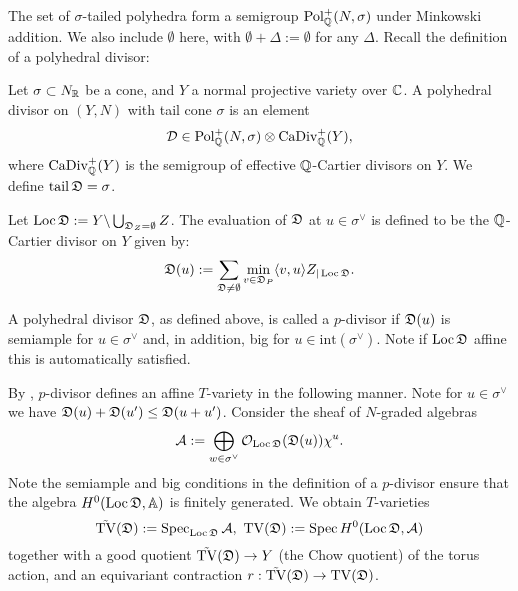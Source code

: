 The set of \(\sigma\)-tailed polyhedra form a semigroup \(\operatorname{Pol}_{\mathbb{Q}}^+(N,\sigma)\) under Minkowski addition. We also include \(\emptyset\) here, with \(\emptyset + \Delta := \emptyset\) for any \(\Delta\). Recall the definition of a polyhedral divisor:
\begin{definition}
Let \(\sigma \subset N_{\mathbb{R}}\) be a cone, and \(Y\) a normal projective variety over \(\mathbb{C}\). A polyhedral divisor on \((Y,N)\) with tail cone \(\sigma\) is an element
\[
\mathcal{D} \in \operatorname{Pol}_{\mathbb{Q}}^+(N,\sigma) \otimes \operatorname{CaDiv}_{\mathbb{Q}}^+(Y),
\]
where \(\operatorname{CaDiv}_{\mathbb{Q}}^+(Y)\) is the semigroup of effective \(\mathbb{Q}\)-Cartier divisors on \(Y\). We define \(\operatorname{tail} {\mathfrak{D}} = \sigma\).
\end{definition}
Let \(\operatorname{Loc} {\mathfrak{D}} := Y \backslash \bigcup_{{\mathfrak{D}}_Z = \emptyset} Z\). The evaluation of \({\mathfrak{D}}\) at \(u \in \sigma^\vee\) is defined to be the \(\mathbb{Q}\)-Cartier divisor on \(Y\) given by:
\[
{\mathfrak{D}}(u) :=  \sum_{{\mathfrak{D}} \neq \emptyset} \min_{v \in {\mathfrak{D}}_P} \langle v,u \rangle Z_{|\operatorname{Loc} {\mathfrak{D}}}.
\]
\begin{definition}
A polyhedral divisor \({\mathfrak{D}}\), as defined above, is called a \(p\)-divisor if \({\mathfrak{D}}(u)\) is semiample for \(u \in \sigma^\vee\) and, in addition, big for \(u \in \text{int}(\sigma^\vee)\). Note if \(\operatorname{Loc} {\mathfrak{D}}\) affine this is automatically satisfied.
\end{definition}

By \cite[Proposition 3.1]{hausen2018torus}, \(p\)-divisor defines an affine \(T\)-variety in the following manner. Note for \(u \in \sigma^\vee\) we have \({\mathfrak{D}}(u) + {\mathfrak{D}}(u') \le {\mathfrak{D}}(u+u')\). Consider the sheaf of \(N\)-graded algebras
\[
\mathcal{A} := \bigoplus_{w \in \sigma^{\vee}} \mathcal{O}_{\operatorname{Loc} {\mathfrak{D}}} ({\mathfrak{D}}(u)) \chi^u.
\]
Note the semiample and big conditions in the definition of a \(p\)-divisor ensure that the algebra \(H^0(\operatorname{Loc} {\mathfrak{D}}, \mathbb{A})\) is finitely generated. We obtain \(T\)-varieties
\[
\tilde{\operatorname{TV}}({\mathfrak{D}}) := \operatorname{Spec}_{\operatorname{Loc} {\mathfrak{D}}} \mathcal{A} , \ \operatorname{TV}({\mathfrak{D}}) := \operatorname{Spec} H^0(\operatorname{Loc} {\mathfrak{D}}, \mathcal{A})
\]
together with a good quotient \(\tilde{\operatorname{TV}}({\mathfrak{D}}) \to Y\) (the Chow quotient) of the torus action, and an equivariant contraction \(r: \tilde{\operatorname{TV}}({\mathfrak{D}}) \to \operatorname{TV}({\mathfrak{D}}) \).

